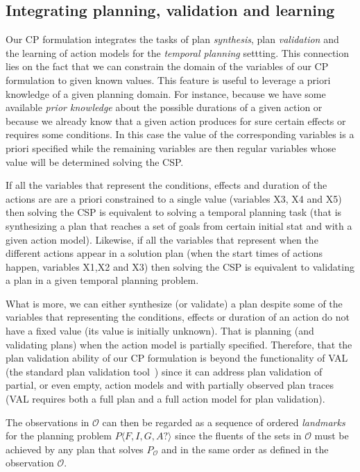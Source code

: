 \documentclass{ecai}
\newcommand{\tup}[1]{{\langle #1 \rangle}}
\begin{document}
\subsection{Integrating planning, validation and learning}
Our CP formulation integrates the tasks of plan {\em synthesis}, plan {\em validation} and the learning of action models for the {\em temporal planning} settting. This connection lies on the fact that we can constrain the domain of the variables of our CP formulation to given known values. This feature is useful to leverage a priori knowledge of a given planning domain. For instance, because we have some available {\em prior knowledge} about the possible durations of a given action or because we already know that a given action produces for sure certain effects or requires some conditions. In this case the value of the corresponding variables is a priori specified while the remaining variables are then regular variables whose value will be determined solving the CSP.

If all the variables that represent the conditions, effects and duration of the actions are are a priori constrained to a single value (variables X3, X4 and X5) then solving the CSP is equivalent to solving a temporal planning task (that is synthesizing a plan that reaches a set of goals from certain initial stat and with a given action model). Likewise, if all the variables that represent when the different actions appear in a solution plan (when the start times of actions happen, variables X1,X2 and X3) then solving the CSP is equivalent to validating a plan in a given temporal planning problem.

What is more, we can either synthesize (or validate) a plan despite some of the variables that representing the conditions, effects or duration of an action do not have a fixed value (its value is initially unknown). That is planning (and validating plans) when the action model is partially specified. Therefore, that the plan validation ability of our CP formulation is beyond the functionality of VAL (the standard plan validation tool~\cite{howey2004val}) since it can address plan validation of partial, or even empty, action models and with partially observed plan traces (VAL requires both a full plan and a full action model for plan validation).

The observations in $\mathcal{O}$ can then be regarded as a sequence of ordered {\em landmarks}~\cite{hoffmann2004ordered} for the planning problem $P\tup{F,I,G,A?}$ since the fluents of the sets in $\mathcal{O}$ must be achieved by any plan that solves $P_\mathcal{O}$ and in the same order as defined in the observation $\mathcal{O}$.
\end{document}
